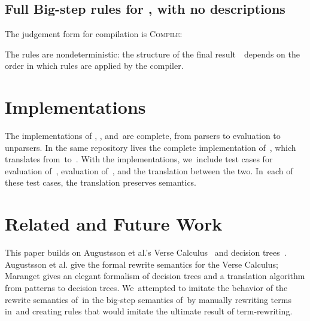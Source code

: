 \documentclass[article,screen,12pt, nonacm]{acmart}
\begin{document}

      \subsection{Full Big-step rules for \Compile, with no descriptions}

        The judgement form for compilation is \textsc{Compile}: 


The rules are nondeterministic: the structure of the final result~\expr\ depends
on the order in which rules are applied by the compiler.  

\begingroup
\scriptsize
\rawcompiler
\endgroup


    \section{Implementations}

    The implementations of \VMinus, \PPlus, and~\D are complete, from parsers to
    evaluation to unparsers. In the same repository lives the complete
    implementation of~\DTran, which translates from~\VMinus to~\D. With the
    implementations, we~include test cases for evaluation of~\VMinus, evaluation
    of~\D, and the translation between the two. In~each of these test cases, the
    translation preserves semantics. 


    \section{Related and Future Work}

    This paper builds on Augustsson et al.'s Verse Calculus~\citep{verse} and
    decision trees~\citep{maranget}. Augustsson et al. give the formal rewrite
    semantics for the Verse Calculus; Maranget gives an elegant formalism of
    decision trees and a translation algorithm from patterns to decision trees.
    We~attempted to imitate the behavior of the rewrite semantics of~\VC in the
    big-step semantics of~\VMinus by manually rewriting terms in~\VC and
    creating rules that would imitate the ultimate result of term-rewriting.
    
\end{document}

